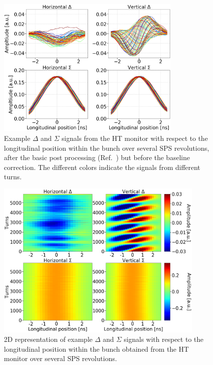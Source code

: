 \begin{figure}[!h]
   \centering         
   \includegraphics[width=0.8\textwidth]{images/Ch4/HT_1D__20180530_135105exampleAcq_4thesis_turnsStart0_Stop6000_step100_new.png}
       \caption{Example $\Delta$ and $\Sigma$ signals from the HT monitor with respect to the longitudinal position within the bunch over several SPS revolutions, after the basic post processing (Ref.~\cite{Levens:2313358}) but before the baseline correction. The different colors indicate the signals from different turns.}
       \label{fig:HT_example_signals}
\end{figure}

\begin{figure}[!h]
   \centering         
   \includegraphics[width=0.9\textwidth]{images/Ch4/HT_2D__20180530_135105_colorbar_new_version.png}
       \caption{2D representation of example $\Delta$ and $\Sigma$ signals with respect to the longitudinal position within the bunch obtained from the HT monitor over several SPS revolutions.}
       \label{fig:HT_example_signals_2D}
\end{figure}


